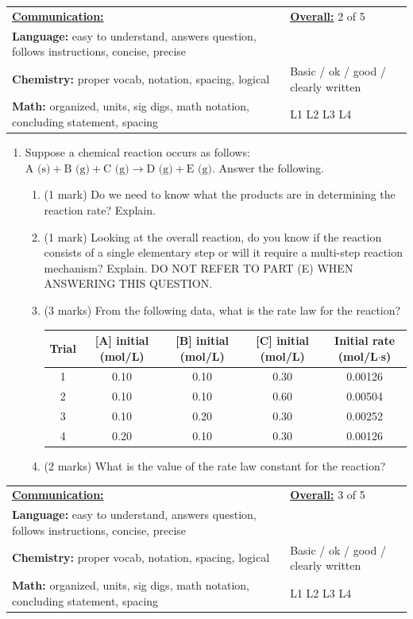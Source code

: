 \documentclass[11pt]{article}
\newcommand{\testheader}[1]{
\noindent
\begin{tabularx}{\textwidth}{|X|m{4.5cm}|}
\hline
\textbf{\underline{Communication:}} & \textbf{\underline{Overall:}} \hfill #1 of 5 \\
\textbf{Language:} easy to understand, answers question, follows instructions, concise, precise & \\
\textbf{Chemistry:} proper vocab, notation, spacing, logical & Basic / ok / good / clearly written \\
\textbf{Math:} organized, units, sig digs, math notation, concluding statement, spacing & \space\space L1 \space\space L2 \space\space L3 \space\space\space\space\space L4 \\
\hline
\end{tabularx}
\vspace{0.4cm}
}
\begin{document}
\vfill

\newpage

\testheader{2}

\begin{enumerate}[leftmargin=*, label=\arabic*., start=4]
    \item Suppose a chemical reaction occurs as follows: $\text{A (s)} + \text{B (g)} + \text{C (g)} \rightarrow \text{D (g)} + \text{E (g)}$. Answer the following.
    \begin{enumerate}[label=\alph*.)]
        \item (1 mark) Do we need to know what the products are in determining the reaction rate? Explain.
        \vspace{2.5cm}
        \item (1 mark) Looking at the overall reaction, do you know if the reaction consists of a single elementary step or will it require a multi-step reaction mechanism? Explain. DO NOT REFER TO PART (E) WHEN ANSWERING THIS QUESTION.
        \vspace{2.5cm}
        \item (3 marks) From the following data, what is the rate law for the reaction? \\
        
        \begin{center}
        \begin{tabular}{|c|c|c|c|c|}
        \hline
        Trial & [A] initial (mol/L) & [B] initial (mol/L) & [C] initial (mol/L) & Initial rate (mol/L$\cdot$s) \\ \hline
        1 & 0.10 & 0.10 & 0.30 & 0.00126 \\ \hline
        2 & 0.10 & 0.10 & 0.60 & 0.00504 \\ \hline
        3 & 0.10 & 0.20 & 0.30 & 0.00252 \\ \hline
        4 & 0.20 & 0.10 & 0.30 & 0.00126 \\ \hline
        \end{tabular}
        \end{center}
        \vspace{4cm}
        \item (2 marks) What is the value of the rate law constant for the reaction?
    \end{enumerate}
\end{enumerate}

\vfill

\newpage

\testheader{3}
\end{document}
